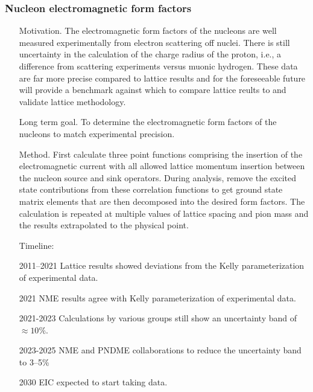 \documentclass[prd,showpacs,showkeys,preprintnumbers,floatfix,
nofootinbib%
]{revtex4-2}
\begin{document}
\subsubsection{Nucleon electromagnetic form factors}
\begin{itemize}
    \item[Motivation.] The electromagnetic form factors of the nucleons are well measured experimentally from electron 
      scattering off nuclei.  There is still uncertainty in the calculation of the charge radius of the proton, i.e., 
      a difference from scattering experiments versus muonic hydrogen.  These data are far more precise compared to 
      lattice results and for the foreseeable future will provide a benchmark against which to compare lattice reults to 
      and validate lattice methodology. 
    \item[Long term goal.] To determine the electromagnetic form factors of the nucleons to match experimental precision. 
    \item[Method.] First calculate three point functions comprising the insertion of the electromagnetic current
      with all allowed lattice momentum insertion between the nucleon source and sink operators. During analysis, remove 
      the excited state contributions from these correlation functions to get ground state matrix elements that are 
      then decomposed into the desired form factors. The calculation is repeated at multiple values of lattice spacing and 
      pion mass and the results extrapolated to the physical point. 
\item[Timeline:]
    \item[2011--2021] Lattice results showed deviations from the Kelly parameterization of experimental data. 
    \item[2021] NME results agree with Kelly parameterization of experimental data.
    \item[2021-2023] Calculations by various groups still show an uncertainty band of $\approx 10\%$.
    \item[2023-2025] NME and PNDME collaborations to reduce the uncertainty band to 3--5\%
    \item[2030] EIC expected to start taking data.
\end{itemize}

\end{document}
